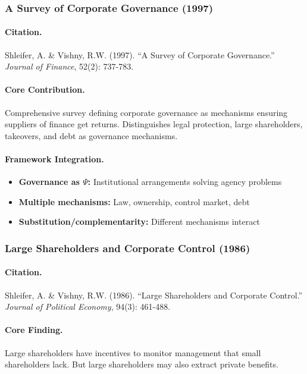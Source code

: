 \subsubsection{A Survey of Corporate Governance (1997)}

\paragraph{Citation.}
Shleifer, A. \& Vishny, R.W. (1997).
``A Survey of Corporate Governance.'' \emph{Journal of Finance}, 52(2): 737-783.

\paragraph{Core Contribution.}
Comprehensive survey defining corporate governance as mechanisms ensuring
suppliers of finance get returns. Distinguishes legal protection, large
shareholders, takeovers, and debt as governance mechanisms.

\paragraph{Framework Integration.}
\begin{itemize}
  \item \textbf{Governance as $\Psi$:} Institutional arrangements solving agency problems
  \item \textbf{Multiple mechanisms:} Law, ownership, control market, debt
  \item \textbf{Substitution/complementarity:} Different mechanisms interact
\end{itemize}

\subsubsection{Large Shareholders and Corporate Control (1986)}

\paragraph{Citation.}
Shleifer, A. \& Vishny, R.W. (1986).
``Large Shareholders and Corporate Control.''
\emph{Journal of Political Economy}, 94(3): 461-488.

\paragraph{Core Finding.}
Large shareholders have incentives to monitor management that small
shareholders lack. But large shareholders may also extract private benefits.

